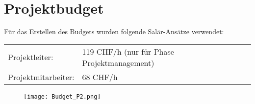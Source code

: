 \renewcommand{\arraystretch}{1.2}
\section{Projektbudget}
Für das Erstellen des Budgets wurden folgende Salär-Ansätze verwendet: 
\begin{table}[H]
\begin{tabular}{ll}
Projektleiter:      & 119 CHF/h (nur für Phase Projektmanagement) \\
Projektmitarbeiter: & 68 CHF/h                                   
\end{tabular}
\end{table}

\begin{figure}[H]
	\centering
	\texttt{[image: Budget\_P2.png]}
	\label{fig:Budget}
\end{figure}